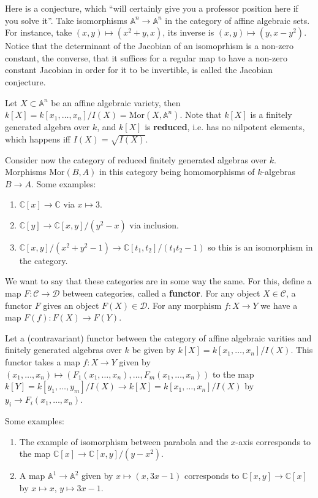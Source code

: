 \documentclass[12pt]{article}
\newcommand{\C}{\mathbb{C}}
\newcommand{\A}{\mathbb{A}}
\newcommand{\Mor}{\mathrm{Mor}}
\begin{document}
    Here is a conjecture, which ``will certainly give you a professor position here if you solve it''. Take isomorphisms $\A^n \to \A^n$ in the category of affine algebraic sets. For instance, take $(x, y) \mapsto (x^2 + y, x)$, its inverse is $(x, y) \mapsto (y, x-y^2)$. Notice that the determinant of the Jacobian of an isomoprhism is a non-zero constant, the converse, that it suffices for a regular map to have a non-zero constant Jacobian in order for it to be invertible, is called the Jacobian conjecture. \par 
    Let $X\subset \A^n$ be an affine algebraic variety, then $k[X] = k[x_1, \dots, x_n]/I(X) = \Mor(X, \A^n)$. Note that $k[X]$ is a finitely generated algebra over $k$, and $k[X]$ is \textbf{reduced}, i.e. has no nilpotent elements, which happens iff $I(X) = \sqrt{I(X)}$. \par 
    Consider now the category of reduced finitely generated algebras over $k$. Morphisms $\Mor(B, A)$ in this category being homomorphisms of $k$-algebras $B \to A$. Some examples:
    \begin{enumerate}
        \item $\C[x] \to \C$ via $x \mapsto 3$.
        \item $\C[y] \to \C[x, y]/(y^2 - x)$ via inclusion. 
        \item $\C[x, y]/(x^2+y^2-1) \xrightarrow{} \C[t_1, t_2]/(t_1t_2 - 1)$ so this is an isomorphism in the category.
    \end{enumerate} 
    We want to say that these categories are in some way the same. For this, define a map $F: \mathcal{C} \to \mathcal{D}$ between categories, called a \textbf{functor}. For any object $X \in \mathcal{C}$, a functor $F$ gives an object $F(X) \in \mathcal{D}$. For any morphism $f: X \to Y$ we have a map $F(f): F(X) \to F(Y)$. \par 
    Let a (contravariant) functor between the category of affine algebraic varities and finitely generated algebras over $k$ be given by $k[X] = k[x_1, \dots, x_n]/I(X)$. This functor takes a map $f: X \to Y$ given by $(x_1, \dots, x_n) \mapsto (F_1(x_1, \dots, x_n), \dots, F_m(x_1, \dots, x_n))$ to the map $k[Y] = k[y_1, \dots, y_m]/I(X) \to k[X] = k[x_1, \dots, x_n]/I(X)$ by $y_i \to F_i(x_1, \dots, x_n)$. \par 
    Some examples: 
    \begin{enumerate}
        \item The example of isomorphism between parabola and the $x$-axis corresponds to the map $\C[x] \to \C[x, y]/(y-x^2)$. 
        \item A map $\A^1 \to \A^2$ given by $x \mapsto (x, 3x-1)$ corresponds to $\C[x, y] \to \C[x]$ by $x \mapsto x$, $y \mapsto 3x-1$. 
    \end{enumerate}
\end{document}
